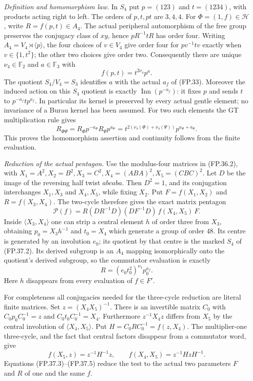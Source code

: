 \emph{Definition and homomorphism law.}
In $S_4$ put $p=(123)$ and $t=(1234)$, with products acting
right to left. The orders of $p,t,pt$ are $3,4,4$.
For $\Phi=(1,f)\in\mathcal H$, write $R=f(p,t)\in A_4$.
The actual peripheral automorphism of the free group preserves
the conjugacy class of $xy$, hence $pR^{-1}tR$ has order four.
Writing $A_4=V_4\rtimes\langle p\rangle$, the four choices
of $v\in V_4$ give order four for $pv^{-1}tv$ exactly when
$v\in\{1,t^2\}$; the other two choices give order two.
Consequently there are unique $\nu_4\in\mathbb F_2$ and
$a\in\mathbb F_3$ with
\[
                 f(p,t)=t^{2\nu_4}p^a.
 \tag{FP.37.2}
\]
The quotient $S_4/V_4=S_3$ identifies $a$ with the actual
$a_f$ of (FP.33). Moreover the induced action on this $S_4$
quotient is exactly $\operatorname{Inn}(p^{-a_f})$:
it fixes $p$ and sends $t$ to $p^{-a_f}tp^{a_f}$.
In particular its kernel is preserved by every actual gentle
element; no invariance of a Burau kernel has been assumed.
For two such elements the GT multiplication rule gives
\[
 R_{\Phi\Psi}
   =R_\Phi p^{-a_\Phi}R_\Psi p^{a_\Phi}
   =t^{2(\nu_4(\Phi)+\nu_4(\Psi))}
                  p^{a_\Phi+a_\Psi}.
\]
This proves the homomorphism assertion and continuity follows
from the finite evaluation.

\emph{Reduction of the actual pentagon.}
Use the modulus-four matrices in (FP.36.2), with
$X_1=A^2,X_2=B^2,X_3=C^2,X_4=(ABA)^2,X_5=(CBC)^2$.
Let $D$ be the image of the reversing half twist
$abcaba$. Then $D^2=1$, and its conjugation interchanges
$X_1,X_3$ and $X_4,X_5$, while fixing $X_2$.
Put $F=f(X_1,X_2)$ and $R=f(X_3,X_4)$. The two-cycle
therefore gives the exact matrix pentagon
\[
 \mathcal P(f)=
 R(DR^{-1}D)(DF^{-1}D)\,f(X_4,X_5)\,F.
 \tag{FP.37.3}
\]
Inside $\langle X_3,X_4\rangle$ one can strip a central
element $h$ of order three from $X_3$, obtaining
$p_0=X_3h^{-1}$ and $t_0=X_4$ which generate a group of
order $48$. Its centre is generated by an involution $e_0$;
its quotient by that centre is the marked $S_4$ of
(FP.37.2). Its derived subgroup is an $A_4$ mapping
isomorphically onto the quotient's derived subgroup, so the
commutator evaluation is exactly
\[
 R=(e_0t_0^2)^{\nu_4}p_0^{a_f}.
 \tag{FP.37.4}
\]
Here $h$ disappears from every evaluation of $f\in F'$.

For completeness all conjugacies needed for the three-cycle
reduction are literal finite matrices. Set
$z=(X_4X_5)^{-1}$. There is an invertible matrix $C_0$ with
$C_0p_0C_0^{-1}=z$ and $C_0t_0C_0^{-1}=X_4$.
Furthermore $z^{-1}X_4z$ differs from $X_5$ by the central
involution of $\langle X_4,X_5\rangle$. Put
$H=C_0RC_0^{-1}=f(z,X_4)$. The multiplier-one three-cycle,
and the fact that central factors disappear from a commutator
word, give
\[
 f(X_5,z)=z^{-1}H^{-1}z,
 \qquad f(X_4,X_5)=z^{-1}HzH^{-1}.
 \tag{FP.37.5}
\]
Equations (FP.37.3)--(FP.37.5) reduce the test to the actual
two parameters $F$ and $R$ of one and the same $f$.

